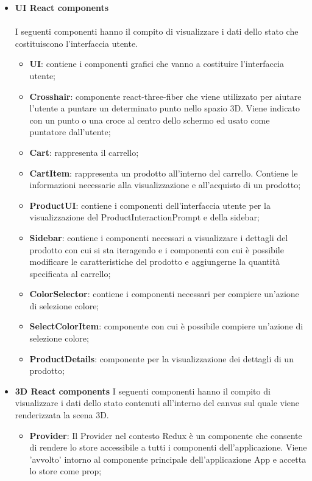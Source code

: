 \begin{itemize}
		\item \textbf{\large UI React components}
		\\\\
		I seguenti componenti hanno il compito di visualizzare i dati dello stato che costituiscono l'interfaccia 
		utente. 
		\begin{itemize}
			\item \textbf{UI}: contiene i componenti grafici che vanno a costituire l'interfaccia
			utente; 
			\item \textbf{Crosshair}: componente react-three-fiber che viene utilizzato per aiutare l'utente a puntare
			un determinato punto nello spazio 3D.
			Viene indicato con un punto o una croce al centro dello schermo ed usato come puntatore dall'utente;
			\item \textbf{Cart}: rappresenta il carrello;
			\item \textbf{CartItem}: rappresenta un prodotto all'interno del carrello.
			Contiene le informazioni necessarie alla visualizzazione e all'acquisto di un prodotto;
			\item \textbf{ProductUI}: contiene i componenti dell'interfaccia utente per la visualizzazione
			del ProductInteractionPrompt e della sidebar;
			\item \textbf{Sidebar}: contiene i componenti necessari a visualizzare i 
			dettagli del prodotto con cui si sta iteragendo e i componenti con cui è possibile modificare le caratteristiche del 
			prodotto e aggiungerne la quantità specificata al carrello;
			\item \textbf{ColorSelector}: contiene i componenti necessari per compiere un'azione di selezione colore;
			\item \textbf{SelectColorItem}: componente con cui è possibile compiere un'azione di selezione colore;
			\item \textbf{ProductDetails}: componente per la visualizzazione dei dettagli di un prodotto;
		\end{itemize}
		\item \textbf{\large 3D React components}
		I seguenti componenti hanno il compito di visualizzare i dati dello stato contenuti all'interno del canvas 
		sul quale viene renderizzata la scena 3D.
		\begin{itemize}
			\item \textbf{Provider}: Il Provider nel contesto Redux è un componente che consente di rendere lo store accessibile
			a tutti i componenti dell'applicazione. 
			Viene 'avvolto' intorno al componente principale dell'applicazione App e accetta lo store come prop; 

\end{itemize}
\end{itemize}
